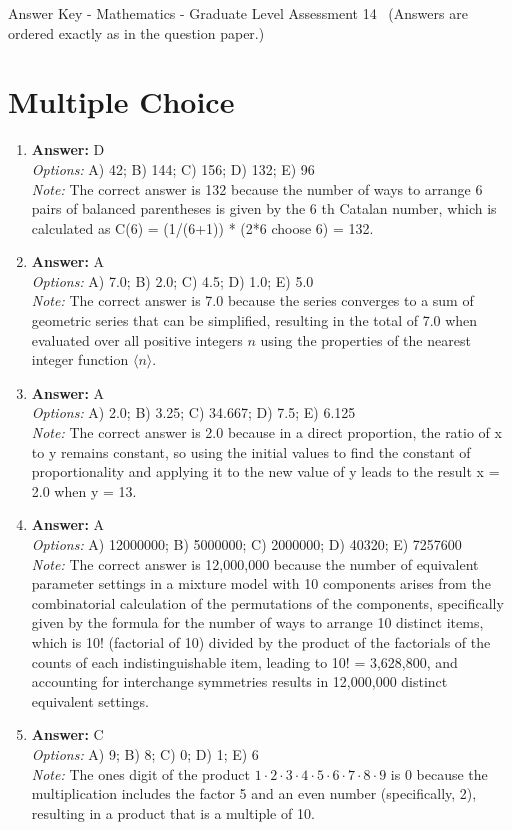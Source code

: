 \documentclass[12pt]{article}
\begin{document}
\begin{center}
Answer Key - Mathematics - Graduate Level Assessment 14 \
\small (Answers are ordered exactly as in the question paper.)
\end{center}

\section*{Multiple Choice}
\begin{enumerate}[label=\arabic*.]
\item \textbf{Answer:} D
\\ \textit{Options:} A) 42; B) 144; C) 156; D) 132; E) 96
\\ \textit{Note:} The correct answer is 132 because the number of ways to arrange 6 pairs of balanced parentheses is given by the 6 th Catalan number, which is calculated as C(6) = (1/(6+1)) * (2*6 choose 6) = 132.
\item \textbf{Answer:} A
\\ \textit{Options:} A) 7.0; B) 2.0; C) 4.5; D) 1.0; E) 5.0
\\ \textit{Note:} The correct answer is 7.0 because the series converges to a sum of geometric series that can be simplified, resulting in the total of 7.0 when evaluated over all positive integers \( n \) using the properties of the nearest integer function \( \langle n \rangle \).
\item \textbf{Answer:} A
\\ \textit{Options:} A) 2.0; B) 3.25; C) 34.667; D) 7.5; E) 6.125
\\ \textit{Note:} The correct answer is 2.0 because in a direct proportion, the ratio of x to y remains constant, so using the initial values to find the constant of proportionality and applying it to the new value of y leads to the result x = 2.0 when y = 13.
\item \textbf{Answer:} A
\\ \textit{Options:} A) 12000000; B) 5000000; C) 2000000; D) 40320; E) 7257600
\\ \textit{Note:} The correct answer is 12,000,000 because the number of equivalent parameter settings in a mixture model with 10 components arises from the combinatorial calculation of the permutations of the components, specifically given by the formula for the number of ways to arrange 10 distinct items, which is 10! (factorial of 10) divided by the product of the factorials of the counts of each indistinguishable item, leading to 10! = 3,628,800, and accounting for interchange symmetries results in 12,000,000 distinct equivalent settings.
\item \textbf{Answer:} C
\\ \textit{Options:} A) 9; B) 8; C) 0; D) 1; E) 6
\\ \textit{Note:} The ones digit of the product \(1 \cdot 2 \cdot 3 \cdot 4 \cdot 5 \cdot 6 \cdot 7 \cdot 8 \cdot 9\) is 0 because the multiplication includes the factor 5 and an even number (specifically, 2), resulting in a product that is a multiple of 10.
\end{enumerate}
\end{document}
